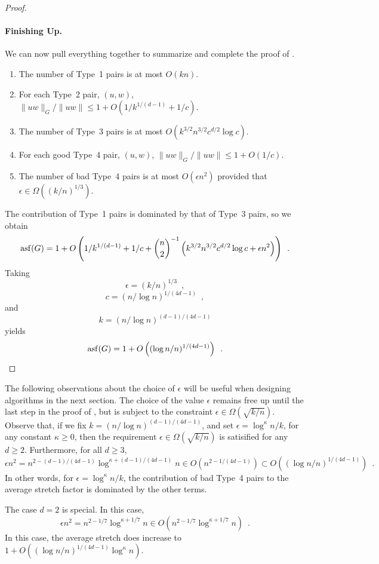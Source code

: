 \documentclass{patmorin}
\DeclareMathOperator{\asf}{asf}
\begin{document}
\begin{proof}
  \paragraph{Finishing Up.}
  We can now pull everything together to summarize and complete the proof
  of .
  \begin{enumerate}
    \item The number of Type~1 pairs is at most $O(kn)$.
    \item For each Type~2 pair, $(u,w)$, 
      $\|uw\|_G/\|uw\|\le 1+ O(1/k^{1/(d-1)}+1/c)$.
    \item The number of Type~3 pairs is at most
      $O(k^{3/2}n^{3/2}c^{d/2}\log c)$.
    \item For each good Type~4 pair, $(u,w)$, 
      $\|uw\|_G/\|uw\|\le 1+ O(1/c)$.
    \item The number of bad Type~4 pairs is at most 
       $O(\epsilon n^2)$ provided that $\epsilon \in \Omega((k/n)^{1/3})$.
  \end{enumerate}
  The contribution of Type~1 pairs is dominated by that of Type~3 pairs,
  so we obtain
  \begin{equation}\eqlabel{master-asf}
     \asf(G) = 1 + O\left(1/k^{1/(d-1)} + 1/c 
       + \binom{n}{2}^{-1}\left(k^{3/2}n^{3/2}c^{d/2}\log c
             +\epsilon n^2\right)\right) \enspace .
  \end{equation}
  Taking 
  \[ 
       \epsilon = (k/n)^{1/3} \enspace ,
  \]
  \[ 
       c = (n/\log n)^{1/(4d-1)} \enspace ,
  \]
  and
  \[
       k = (n/\log n)^{(d-1)/(4d-1)} 
  \]
  yields
  \[
     \asf(G) = 1+ O\left((\log n/n)^{1/(4d-1)}\right) \enspace . \qedhere
  \]
\end{proof}

\begin{rem}
   The following observations about the choice of $\epsilon$ will be
   useful when designing algorithms in the next section.  The choice
   of the value $\epsilon$ remains free up until the last step in the
   proof of , but is subject to the constraint
   $\epsilon \in\Omega(\sqrt{k/n})$.  Observe that, if we fix $k=(n/\log
   n)^{(d-1)/(4d-1)}$, and set $\epsilon = \log^\kappa n/k$, for
   any constant $\kappa \ge 0$, then the requirement $\epsilon \in
   \Omega(\sqrt{k/n})$ is satisified for any $d\ge 2$.  Furthermore,
   for all $d \ge 3$,
   \[
      \epsilon n^2 = n^{2-(d-1)/(4d-1)}\log^{\kappa+(d-1)/(4d-1)} n 
       \in O(n^{2-1/(4d-1)}) \subset O((\log n/n)^{1/(4d-1)}) \enspace .
   \]
   In other words, for $\epsilon = \log^\kappa n/k$, the contribution
   of bad Type~4 pairs to the average stretch factor is dominated by the
   other terms.

   The case $d=2$ is special.  In this case, 
   \[ \epsilon n^2 = n^{2-1/7}\log^{\kappa+1/7} n
        \in O(n^{2-1/7}\log^{\kappa+1/7} n)  \enspace .
   \]
   In this case, the average stretch does increase to
   $1+O((\log n/n)^{1/(4d-1)}\log^{\kappa} n)$.
\end{rem}
\end{document}
